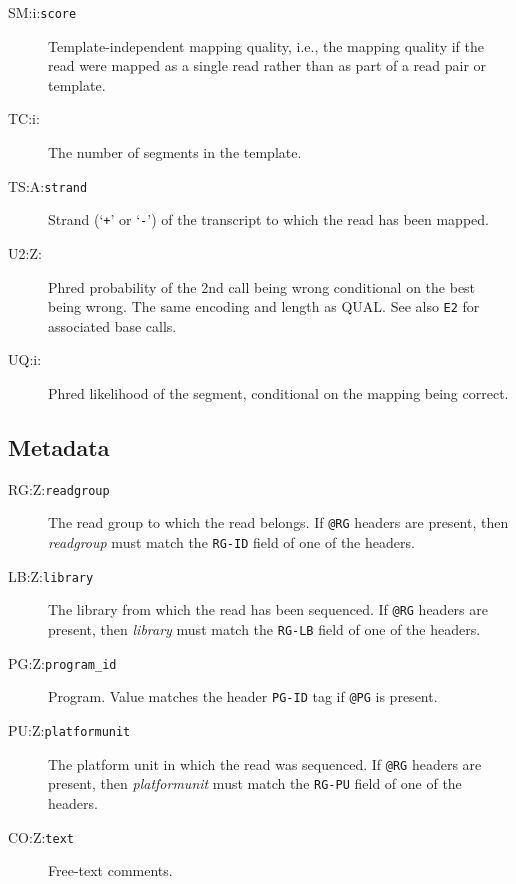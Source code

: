 \documentclass[10pt]{article}
\newcommand{\tagvalue}[1]{{\tt #1}}
\begin{document}
\begin{description}
\item[SM:i:\tagvalue{score}]
Template-independent mapping quality, i.e., the mapping quality if the read were mapped as a single read rather than as part of a read pair or template.

\item[TC:i:\tagvalue{}]
The number of segments in the template.

\item[TS:A:\tagvalue{strand}]
Strand (`{\tt +}' or `{\tt -}') of the transcript to which the read has been mapped.

\item[U2:Z:\tagvalue{}]
Phred probability of the 2nd call being wrong conditional on the best being wrong.
The same encoding and length as {\sf QUAL}.  See also {\tt E2} for associated base calls.

\item[UQ:i:\tagvalue{}]
Phred likelihood of the segment, conditional on the mapping being correct.
\end{description}

\subsection{Metadata}

\begin{description}
\item[RG:Z:\tagvalue{readgroup}]
The read group to which the read belongs.
If {\tt @RG} headers are present, then \emph{readgroup} must match the
{\tt RG-ID} field of one of the headers.

\item[LB:Z:\tagvalue{library}]
The library from which the read has been sequenced.
If {\tt @RG} headers are present, then \emph{library} must match the
{\tt RG-LB} field of one of the headers.

\item[PG:Z:\tagvalue{program\_id}]
Program. Value matches the header {\tt PG-ID} tag if {\tt @PG} is present.

\item[PU:Z:\tagvalue{platformunit}]
The platform unit in which the read was sequenced.
If {\tt @RG} headers are present, then \emph{platformunit} must match the
{\tt RG-PU} field of one of the headers.

\item[CO:Z:\tagvalue{text}]
Free-text comments.
\end{description}
\end{document}
